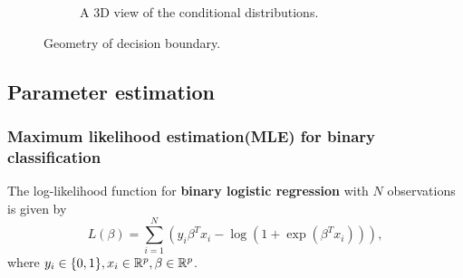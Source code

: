 \begin{refsection}
\begin{figure}[H]
\begin{subfigure}[t]{0.45\textwidth}
		\caption{ A 3D view of the conditional distributions.}
	\end{subfigure}
	\caption{Geometry of decision boundary.}
	\label{fig:linearGaussianDiscriminateModeDecisionBoundaryDemo}
\end{figure}


\subsection{Parameter estimation}
\subsubsection{Maximum likelihood estimation(MLE) for binary classification}

\begin{lemma}\label{ch:statistical-learning:th:LikelihoodFunctionOfLogisticRegression}
	The log-likelihood function for \textbf{binary logistic regression} with $N$ observations is given by
	$$L(\beta) = \sum_{i=1}^{N} (y_i\beta^Tx_i - \log(1 + \exp(\beta^Tx_i))),$$
	where $y_i\in \{0,1\}, x_i\in \mathbb{R}^p,\beta \in \mathbb{R}^p$.	
	

\end{lemma}
\end{refsection}

